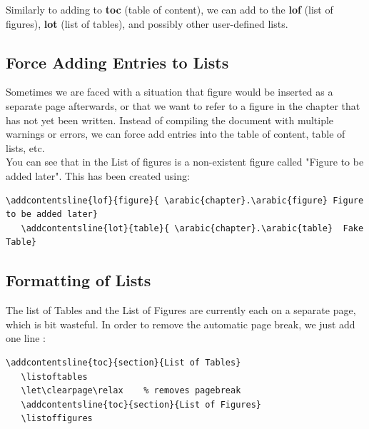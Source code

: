 \documentclass[a4paper,10pt]{report} %
\begin{document}
Similarly to adding to \textbf{toc} (table of content), we can add to the 
\textbf{lof} (list of figures), \textbf{lot} (list of tables), and possibly other user-defined lists.   

  \subsection{Force Adding Entries to Lists}
  Sometimes we are faced with a situation that figure would be inserted as a separate page afterwards, or that we want to refer to a figure in the chapter that has not yet been written. Instead of compiling the document with multiple warnings or errors, we can force add entries into the table of content, table of lists, etc.\\
  
  You can see that in the List of figures is a non-existent figure called "Figure to be added later". This has been created using: 
  
  
   \begin{lstlisting}[language={[latex]tex},
    frame=single,
    basicstyle=\footnotesize\color{darkgray}, 
    keywordstyle=\bf\color{magenta},
    commentstyle=\color{ForestGreen},  %
    breaklines=true
   ]
   \addcontentsline{lof}{figure}{ \arabic{chapter}.\arabic{figure} Figure to be added later}
   \addcontentsline{lot}{table}{ \arabic{chapter}.\arabic{table}  Fake Table}
\end{lstlisting}

\subsection{Formatting of Lists}

The list of Tables and the List of Figures are currently each on a separate page, which is bit wasteful. In order to remove the automatic page break, we just add one line : 
\begin{lstlisting}[language={[latex]tex}, 
  frame=single,
  basicstyle=\footnotesize\color{darkgray}, 
  keywordstyle=\bf\color{magenta},
  commentstyle=\color{ForestGreen},  %
  breaklines=true
  ]
   \addcontentsline{toc}{section}{List of Tables}
   \listoftables  
   \let\clearpage\relax    % removes pagebreak                       
   \addcontentsline{toc}{section}{List of Figures}  
   \listoffigures
\end{lstlisting}
\end{document}
